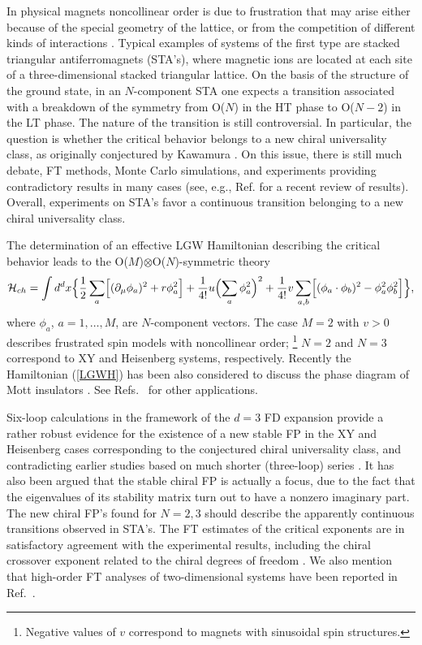 \documentclass[a4paper,12pt]{article}
\begin{document}
In physical magnets noncollinear order is due to frustration that may arise
either because of the special geometry of the lattice, or from the competition 
of different kinds of interactions \cite{Kawamura-98}.
Typical examples of systems of the first type are 
stacked triangular antiferromagnets (STA's), 
where magnetic ions are located at each site of 
a three-dimensional stacked triangular lattice.
On the basis of the structure of the ground state, 
in an $N$-component STA one expects a 
transition associated with a breakdown of 
the symmetry from O($N$) in the HT phase to O($N-2$) in the LT phase. 
The nature of the transition is still controversial. In 
particular, the question is whether the critical behavior belongs
to a new chiral universality class, as originally conjectured by Kawamura \cite{Kawamura-88}.  
On this issue, there is still much 
debate, FT methods, Monte Carlo simulations, and experiments providing 
contradictory results in many cases (see, e.g., Ref.\cite{review}
for a recent review of results).
Overall, experiments on STA's favor a continuous transition
belonging to a new chiral universality class.

The determination of an effective LGW Hamiltonian describing
the critical behavior leads to
the O($M$)$\otimes$O($N$)-symmetric theory \cite{Kawamura-88}
\begin{equation}
{\cal H}_{ch}  = \int d^d x
 \Bigl\{ {1\over2}
      \sum_{a} \Bigl[ (\partial_\mu \phi_{a})^2 + r \phi_{a}^2 \Bigr]
+ {1\over 4!}u \Bigl( \sum_a \phi_a^2\Bigr)^2
+ {1\over 4!}  v
\sum_{a,b} \Bigl[ ( \phi_a \cdot \phi_b)^2 - \phi_a^2\phi_b^2\Bigr]
             \Bigr\},
\label{LGWH}
\end{equation}
where $\phi_a$, $a=1,\ldots, M$, are $N$-component vectors. 
The case $M=2$ with $v>0$ describes  
frustrated spin models with noncollinear order;
\footnote{Negative values of $v$ correspond to magnets 
with sinusoidal spin structures.}
$N=2$ and $N=3$ correspond to
XY and Heisenberg systems, respectively.  
Recently the Hamiltonian (\ref{LGWH}) has been also considered
to discuss the phase diagram of Mott insulators \cite{Sachdev-02}.
See Refs.~\cite{Kawamura-98,review} for other applications.

Six-loop calculations \cite{PRV-01} in the framework of the
$d=3$ FD expansion provide a rather robust evidence
for the existence of a new stable FP in the
XY and Heisenberg cases corresponding to the conjectured
chiral universality class, and  contradicting earlier studies
based on much shorter (three-loop) series \cite{AS-94}.
It has also been argued \cite{CPS-02} that the stable chiral FP
is actually a focus, due to the fact that the eigenvalues of 
its stability matrix turn out to have a nonzero imaginary part.
The new chiral FP's found for $N=2,3$
should describe the apparently continuous transitions observed in STA's.
The FT estimates of the critical exponents are in satisfactory agreement with
the experimental results, including the chiral crossover exponent
related to the chiral degrees of freedom \cite{PRV-02}. 
We also mention that high-order FT analyses of 
two-dimensional systems have been reported in Ref.~\cite{CP-01}.
\end{document}

